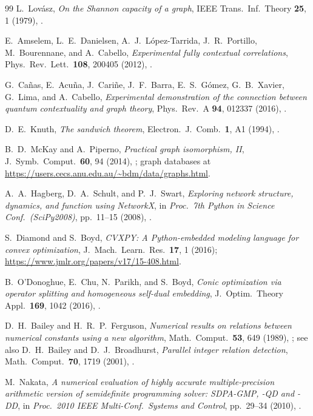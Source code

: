 \documentclass[aps,pra,twocolumn,superscriptaddress,longbibliography,floatfix]{revtex4-2}
\begin{document}
\begin{thebibliography}{99}
L.~Lov\'{a}sz,
\emph{On the Shannon capacity of a graph},
IEEE Trans.\ Inf.\ Theory \textbf{25}, 1 (1979),
.

E.~Amselem, L.~E.~Danielsen, A.~J.~L\'{o}pez-Tarrida, J.~R.~Portillo,
M.~Bourennane, and A.~Cabello,
\emph{Experimental fully contextual correlations},
Phys.\ Rev.\ Lett.\ \textbf{108}, 200405 (2012),
.

G.~Ca\~{n}as, E.~Acu\~{n}a, J.~Cari\~{n}e, J.~F.~Barra,
E.~S.~G\'{o}mez, G.~B.~Xavier, G.~Lima, and A.~Cabello,
\emph{Experimental demonstration of the connection between quantum
contextuality and graph theory},
Phys.\ Rev.\ A \textbf{94}, 012337 (2016),
.

D.~E.~Knuth,
\emph{The sandwich theorem},
Electron.\ J.\ Comb.\ \textbf{1}, A1 (1994),
.

B.~D.~McKay and A.~Piperno,
\emph{Practical graph isomorphism, II},
J.\ Symb.\ Comput.\ \textbf{60}, 94 (2014),
;
graph databases at
\url{https://users.cecs.anu.edu.au/~bdm/data/graphs.html}.

A.~A.~Hagberg, D.~A.~Schult, and P.~J.~Swart,
\emph{Exploring network structure, dynamics, and function using NetworkX},
in \emph{Proc.\ 7th Python in Science Conf.\ (SciPy2008)},
pp.~11--15 (2008),
.

S.~Diamond and S.~Boyd,
\emph{CVXPY: A Python-embedded modeling language for convex optimization},
J.\ Mach.\ Learn.\ Res.\ \textbf{17}, 1 (2016);
\url{https://www.jmlr.org/papers/v17/15-408.html}.

B.~O'Donoghue, E.~Chu, N.~Parikh, and S.~Boyd,
\emph{Conic optimization via operator splitting and homogeneous
self-dual embedding},
J.\ Optim.\ Theory Appl.\ \textbf{169}, 1042 (2016),
.

D.~H.~Bailey and H.~R.~P.~Ferguson,
\emph{Numerical results on relations between numerical constants using
a new algorithm},
Math.\ Comput.\ \textbf{53}, 649 (1989),
;
see also D.~H.~Bailey and D.~J.~Broadhurst,
\emph{Parallel integer relation detection},
Math.\ Comput.\ \textbf{70}, 1719 (2001),
.

M.~Nakata,
\emph{A numerical evaluation of highly accurate multiple-precision arithmetic
version of semidefinite programming solver: SDPA-GMP, -QD and -DD},
in \emph{Proc.\ 2010 IEEE Multi-Conf.\ Systems and Control},
pp.~29--34 (2010),
.


\end{thebibliography}
\end{document}

